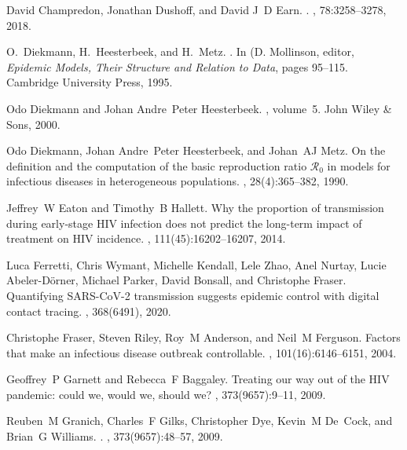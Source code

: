 \documentclass[12pt]{article}
\begin{document}
\begin{thebibliography}{10}
David Champredon, Jonathan Dushoff, and David J~D Earn.
.
, 78:3258--3278, 2018.

O.~Diekmann, H.~Heesterbeek, and H.~Metz.
.
\newblock In (D. Mollinson, editor, {\em Epidemic Models, Their Structure and
  Relation to Data}, pages 95--115. Cambridge University Press, 1995.

Odo Diekmann and Johan Andre~Peter Heesterbeek.
, volume~5.
\newblock John Wiley \& Sons, 2000.

Odo Diekmann, Johan Andre~Peter Heesterbeek, and Johan~AJ Metz.
\newblock On the definition and the computation of the basic reproduction ratio
  $\mathcal{R}_0$ in models for infectious diseases in heterogeneous
  populations.
, 28(4):365--382, 1990.

Jeffrey~W Eaton and Timothy~B Hallett.
\newblock Why the proportion of transmission during early-stage {HIV} infection
  does not predict the long-term impact of treatment on {HIV} incidence.
,
  111(45):16202--16207, 2014.

Luca Ferretti, Chris Wymant, Michelle Kendall, Lele Zhao, Anel Nurtay, Lucie
  Abeler-D{\"o}rner, Michael Parker, David Bonsall, and Christophe Fraser.
\newblock Quantifying {SARS-CoV-2} transmission suggests epidemic control with
  digital contact tracing.
, 368(6491), 2020.

Christophe Fraser, Steven Riley, Roy~M Anderson, and Neil~M Ferguson.
\newblock Factors that make an infectious disease outbreak controllable.
,
  101(16):6146--6151, 2004.

Geoffrey~P Garnett and Rebecca~F Baggaley.
\newblock Treating our way out of the {HIV} pandemic: could we, would we,
  should we?
, 373(9657):9--11, 2009.

Reuben~M Granich, Charles~F Gilks, Christopher Dye, Kevin~M De~Cock, and
  Brian~G Williams.
.
, 373(9657):48--57, 2009.


\end{thebibliography}
\end{document}
